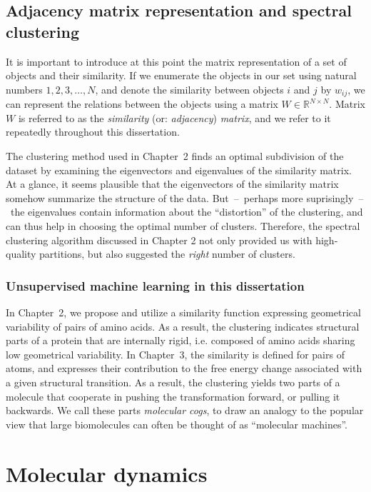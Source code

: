 \documentclass[a4paper,11pt,twoside]{book}%
\begin{document}
\subsection{Adjacency matrix representation and spectral clustering}\label{sec:matrixRepresentation}

It is important to introduce at this point the matrix representation of a set of objects and their similarity.
If we enumerate the objects in our set using natural numbers $1,2,3,\ldots,N$, and denote the similarity between objects $i$ and $j$ by $w_{ij}$, we can represent the relations between the objects using a matrix $W\in\mathbb{R}^{N\times N}$.
Matrix $W$ is referred to as the \emph{similarity} (or: \emph{adjacency}) \emph{matrix}, and we refer to it repeatedly throughout this dissertation.

The clustering method used in Chapter~2 finds an optimal subdivision of the dataset by examining the eigenvectors and eigenvalues of the similarity matrix.
At a glance, it seems plausible that the eigenvectors of the similarity matrix somehow summarize the structure of the data.
But~--~perhaps more suprisingly~--~the eigenvalues contain information about the ``distortion'' of the clustering, and can thus help in choosing the optimal number of clusters.
Therefore, the spectral clustering algorithm discussed in Chapter 2 not only provided us with high-quality partitions, but also suggested the \emph{right} number of clusters.


\subsubsection{Unsupervised machine learning in this dissertation}

In Chapter~2, we propose and utilize a similarity function expressing geometrical variability of pairs of amino acids.
As a result, the clustering indicates structural parts of a protein that are internally rigid, i.e. composed of amino acids sharing low geometrical variability.
In Chapter~3, the similarity is defined for pairs of atoms, and expresses their contribution to the free energy change associated with a given structural transition.
As a result, the clustering yields two parts of a molecule that cooperate in pushing the transformation forward, or pulling it backwards.
We call these parts \emph{molecular cogs}, to draw an analogy to the popular view that large biomolecules can often be thought of as ``molecular machines''. 

\section{Molecular dynamics}
\end{document}
